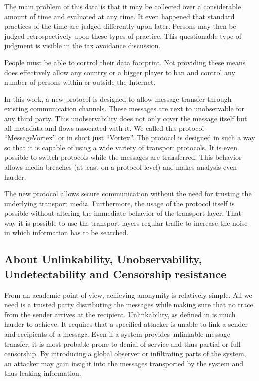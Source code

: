 \documentclass[10pt,journal,compsoc]{IEEEtran}
\begin{document}
The main problem of this data is that it may be collected over a considerable amount of time and evaluated at any time. It even happened that standard practices of the time are judged differently upon later. Persons may then be judged retrospectively upon these types of practice. This questionable type of judgment is visible in the tax avoidance discussion. 

People must be able to control their data footprint. Not providing these means does effectively allow any country or a bigger player to ban and control any number of persons within or outside the Internet.  

In this work, a new protocol is designed to allow message transfer through existing communication channels. These messages are next to unobservable for any third party. This unobservability does not only cover the message itself but all metadata and flows associated with it. We called this protocol ``MessageVortex'' or in short just ``Vortex''. The protocol is designed in such a way so that it is capable of using a wide variety of transport protocols. It is even possible to switch protocols while the messages are transferred. This behavior allows media breaches (at least on a protocol level) and makes analysis even harder.

The new protocol allows secure communication without the need for trusting the underlying transport media. Furthermore, the usage of the protocol itself is possible without altering the immediate behavior of the transport layer. That way it is possible to use the transport layers regular traffic to increase the noise in which information has to be searched. 

\subsection{About Unlinkability, Unobservability, Undetectability and Censorship resistance}
From an academic point of view, achieving anonymity is relatively simple. All we need is a trusted party distributing the messages while making sure that no trace from the sender arrives at the recipient. Unlinkability, as defined in \cite{anon_terminology} is much harder to achieve. It requires that a specified attacker is unable to link a sender and recipients of a message. Even if a system provides unlinkable message transfer, it is most probable prone to denial of service and thus partial or full censorship. By introducing a global observer or infiltrating parts of the system, an attacker may gain insight into the messages transported by the system and thus leaking information.
\end{document}
